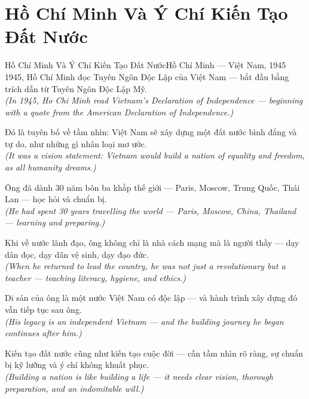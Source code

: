 \section{Hồ Chí Minh Và Ý Chí Kiến Tạo Đất Nước}
\begin{truyen}{Hồ Chí Minh Và Ý Chí Kiến Tạo Đất Nước}{Hồ Chí Minh --- Việt Nam, 1945}
 1945, Hồ Chí Minh đọc Tuyên Ngôn Độc Lập của Việt Nam --- bắt đầu bằng trích dẫn từ Tuyên Ngôn Độc Lập Mỹ.\\[4pt]
\textit{(In 1945, Ho Chi Minh read Vietnam's Declaration of Independence --- beginning with a quote from the American Declaration of Independence.)}

Đó là tuyên bố về tầm nhìn: Việt Nam sẽ xây dựng một đất nước bình đẳng và tự do, như những gì nhân loại mơ ước.\\[4pt]
\textit{(It was a vision statement: Vietnam would build a nation of equality and freedom, as all humanity dreams.)}

Ông đã dành 30 năm bôn ba khắp thế giới --- Paris, Moscow, Trung Quốc, Thái Lan --- học hỏi và chuẩn bị.\\[4pt]
\textit{(He had spent 30 years travelling the world --- Paris, Moscow, China, Thailand --- learning and preparing.)}

Khi về nước lãnh đạo, ông không chỉ là nhà cách mạng mà là người thầy --- dạy dân đọc, dạy dân vệ sinh, dạy đạo đức.\\[4pt]
\textit{(When he returned to lead the country, he was not just a revolutionary but a teacher --- teaching literacy, hygiene, and ethics.)}

Di sản của ông là một nước Việt Nam có độc lập --- và hành trình xây dựng đó vẫn tiếp tục sau ông.\\[4pt]
\textit{(His legacy is an independent Vietnam --- and the building journey he began continues after him.)}

\end{truyen}
\begin{baihoc}
  Kiến tạo đất nước cũng như kiến tạo cuộc đời --- cần tầm nhìn rõ ràng, sự chuẩn bị kỹ lưỡng và ý chí không khuất phục.\\[4pt]
  \textit{(Building a nation is like building a life --- it needs clear vision, thorough preparation, and an indomitable will.)}
\end{baihoc}

